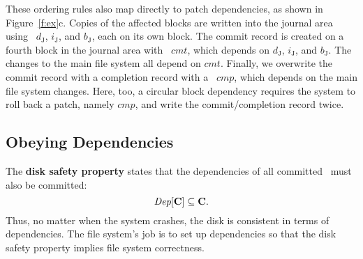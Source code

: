 \def\PXcmt{\textit{cmt}}
\def\PXcmp{\textit{cmp}}

These ordering rules also map directly to patch dependencies, as shown in
 Figure~\ref{f:ex}c.
%
Copies of the affected blocks are written into the journal area using
 \patches\ $d_\textrm{J}$, $i_\textrm{J}$, and $b_\textrm{J}$, each on its
 own block.
%
The commit record is created on a fourth block in the journal area with
\patch\ $\PXcmt$, which depends on $d_\textrm{J}$,
$i_\textrm{J}$, and $b_\textrm{J}$.
%
The changes to the main file system all depend on $\PXcmt$.
%
Finally, we overwrite the commit record with a completion record with a
\patch\ $\PXcmp$, which depends on the main file system changes.
%
Here, too, a circular block dependency requires the system to roll back a
 patch, namely $\PXcmp$, and write the commit/completion record twice.

\begin{comment}
This arrangement of dependencies ensures that the commit record is not written
to disk until all the journal data is present there, that the updates to the
file system itself are not written until the commit record is present on disk,
and that the completion record is not written until the entire transaction is
complete.

This example also contains an instance of a \patch\ which will need to be
reverted: $cmp$, which overwrites the commit record written by $cmt$ (and
thus $\PBlock{cmp} = \PBlock{cmt}$), cannot be written with $cmt$ since
$cmp \PDDepend \{b$, $i$, $i'$, $d\} \PDDepend cmt$.
%
So, we must revert $cmp$ and write $\PBlock{cmp}$ with only $cmt$ applied,
then write $b$, $i$, $i'$, and $d$, and finally write $\PBlock{cmp}$
again in order to write $cmp$.
\end{comment}


\subsection{Obeying Dependencies}
\label{sec:patch:dependencies}

The \textbf{disk safety property} states that
 the dependencies of all committed \patches\ must also be committed:
%
\[ \PDepset{\PDisk} \subseteq \PDisk. \]
%
Thus, no matter when the system crashes, the disk is consistent in terms of
dependencies.
%
The file system's job is to set up dependencies so that the disk safety
property implies file system correctness.

\begin{comment}
 However, \Kudos\ can only control when \patches\ are handed to the disk
 controller, not when they are written to disk.
 Disk controller behavior is encapsulated in the following atomic action:

 \begin{tabbing}
 \textit{Commit block:} \\
 \quad Pick some block $b$ with $\PInf[b] \neq \emptyset$. \\
 \quad Move each $p \in \PInf[b]$ to $\PDisk$ (committed).
 \end{tabbing}
\end{comment}

